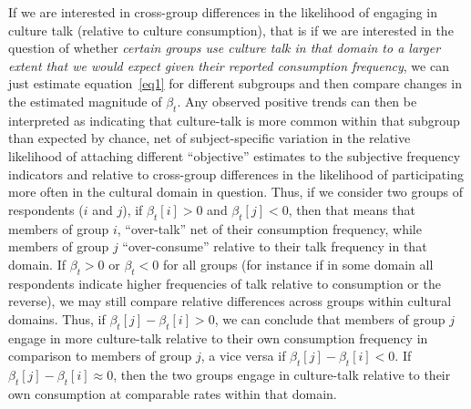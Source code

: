 If we are interested in cross-group differences in the likelihood of engaging in culture talk (relative to culture consumption), that is if we are interested in the question of whether \emph{certain groups use culture talk in that domain to a larger extent that we would expect given their reported consumption frequency}, we can just estimate equation~\ref{eq1} for different subgroups and then compare changes in the estimated magnitude of $\beta_t$.  Any observed positive trends can then be interpreted as indicating that culture-talk is more common within that subgroup than expected by chance, net of subject-specific variation in the relative likelihood of attaching different ``objective'' estimates to the subjective frequency indicators and relative to cross-group differences in the likelihood of participating more often in the cultural domain in question.  Thus, if we consider two groups of respondents ($i$ and $j$), if $\beta_t[i]>0$ and $\beta_t[j]<0$, then that means that members of group $i$, ``over-talk'' net of their consumption frequency, while members of group $j$ ``over-consume'' relative to their talk frequency in that domain.  If $\beta_t>0$  or $\beta_t<0$ for all groups (for instance if in some domain all respondents indicate higher frequencies of talk relative to consumption or the reverse), we may still compare relative differences across groups within cultural domains.  Thus, if $\beta_t[j]-\beta_t[i]>0$, we can conclude that members of group $j$ engage in more culture-talk relative to their own consumption frequency in comparison to members of group $j$, a vice versa if  $\beta_t[j]-\beta_t[i]<0$.  If $\beta_t[j]-\beta_t[i] \approx 0$, then the two groups engage in culture-talk relative to their own consumption at comparable rates within that domain.




